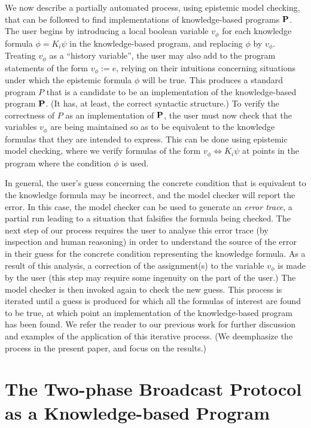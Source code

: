 \documentclass[]{llncs}
\newcommand{\dimp}{\Leftrightarrow}
\begin{document}
We now describe a partially automated process, using epistemic model checking, 
that can be followed to find implementations of knowledge-based programs ${\bf P}$. 
The user begins by introducing a local boolean variable $v_\phi$ for each knowledge formula
$\phi= K_i\psi$ in the knowledge-based program, and replacing $\phi$ by $v_\phi$. 
Treating $v_\phi$  as a ``history variable'', the user may also add to the program statements of the form $v_\phi:=e$, 
relying on their intuitions concerning situations under which the epistemic formula $\phi$ will be true. This produces a
standard program $P$ that is a candidate to be an implementation of the knowledge-based program
${\bf P}$. 
(It has, at least,  the correct syntactic structure.) 
To verify  the correctness of $P$ as an implementation of ${\bf P}$, the user must now 
check that the variables $v_\phi$ are being maintained so as to be equivalent to the 
knowledge formulas that they are intended to express. This can be done using epistemic model checking, 
where we verify formulas of the form $v_\phi \dimp K_i\psi$
at points in the program where the condition $\phi$ is used.  

In general, the user's guess concerning the concrete condition that is equivalent to the  knowledge formula 
may be incorrect, and the 
model checker will report the error. In this case, the model checker can be used  to generate an {\em error trace}, a 
partial run leading to a situation that falsifies the formula being checked. 
The next step of our process requires the user to analyse this error trace (by inspection and human reasoning) 
in order to understand the source of the error in their guess for the concrete condition representing the knowledge formula. 
As a result of this analysis, a correction of the assignment(s) to the variable $v_\phi$ is made 
by the user (this step may require some ingenuity on the part of the user.) 
The model checker is then invoked again to check the new guess. 
This process is iterated until a guess is produced for which all the formulas of interest are found to be true, 
at which point an implementation of the knowledge-based program has been found. 
We refer the reader to our previous work \cite{AlBatainehMeyden10} for further discussion and examples of the 
application of this iterative process. (We deemphasize the process in the present paper, and 
focus on the results.) 


\section{The Two-phase Broadcast Protocol as a Knowledge-based Program}\label{sec:dckbp}
\end{document}
